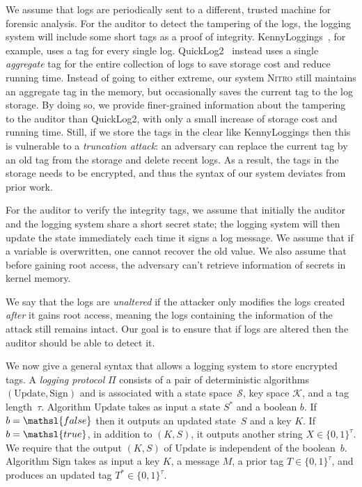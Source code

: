 \documentclass[sigconf]{sty/acmart}
\newcommand{\Sys}{\mbox{\textsc{Nitro}}\xspace}
\newcommand{\qltwo}{QuickLog2\xspace}
\newcommand{\kl}{KennyLoggings\xspace}
\newcommand{\heading}[1]{\vspace{6pt}\noindent{\underline{\textsc{#1}}}}
\newcommand{\calK}{{\mathcal K}}
\newcommand{\bits}{\{0, 1\}}
\newcommand{\true}{\mathsl{true}}
\newcommand{\Update}{\mathrm{Update}}
\newcommand{\Sign}{\mathrm{Sign}}
\newcommand{\calS}{{\mathcal S}}
\newcommand{\false}{\mathsl{false}}
\begin{document}
We assume that logs are periodically sent to a different, trusted machine for forensic analysis. 
For the auditor to detect the tampering of the logs, the logging system will include some short tags
as a proof of integrity. 
\kl~\cite{kennylog},  for example, uses a tag for every single log. 
\qltwo~\cite{281386} instead uses a single \emph{aggregate} tag for the entire collection of logs
to save storage cost and reduce running time. 
Instead of going to either extreme, our system \Sys still maintains an aggregate tag in the memory, 
but occasionally saves the current tag to the log storage. 
By doing so, we provide  finer-grained information about the tampering to the auditor than \qltwo, 
with only a small increase of storage cost and running time. 
Still, if we store the tags in the clear like \kl then this is vulnerable to a \emph{truncation attack}: 
an adversary can replace the current tag by an old tag from the storage and delete recent logs. 
As a result, the tags in the storage needs to be encrypted, 
and thus the syntax of our system deviates from prior work. 




For the auditor to verify the integrity tags, we assume that initially the 
auditor and the logging system share a short secret state; the logging system will then update the state
immediately each time it signs a log message. 
We assume that if a variable is overwritten, one cannot recover the old value. 
We also assume that before gaining root access, the adversary can't retrieve information of secrets in kernel memory. 


We say that the logs are \emph{unaltered}  if the attacker only modifies the logs created \emph{after} it gains root access, 
meaning the logs containing the information of the attack still remains intact. 
Our goal is to ensure that if logs are altered then the auditor should be able to detect it. 

\heading{Syntax.}
We now give a general syntax that allows a logging system to store encrypted tags. 
 A \emph{logging protocol} $\Pi$  consists of a pair
of deterministic algorithms $(\Update, \Sign)$ and is associated with a state space~$\calS$, key space $\calK$, 
and a tag length~$\tau$. 
Algorithm $\Update$ takes as input a state $S^*$ and a boolean $b$. 
If $b = \false$ then it outputs an updated state~$S$ and a key $K$. 
If $b = \true$, in addition to $(K, S)$, it outputs another string $X \in \bits^\tau$. 
We require that the output $(K, S)$ of $\Update$ is independent of the boolean~$b$. 
Algorithm $\Sign$ takes as input a key $K$, a message $M$, a prior tag $T \in \bits^\tau$, 
and produces an updated tag $T^* \in \bits^\tau$. 
\end{document}
